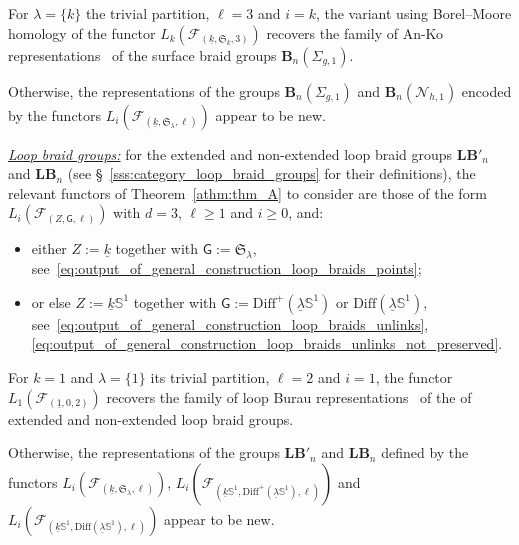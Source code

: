 \documentclass[AHL,Unicode,published]{cedram}
\newcommand{\Diff}{\mathrm{Diff}}
\newcommand{\B}{\ensuremath{\mathbf{B}}}
\newcommand{\lB}{\mathbf{LB}}
\newcommand{\Sym}{\mathfrak{S}}
\newcommand{\N}{\mathscr{N}}
\newcommand{\sG}{\mathsf{G}}
\newcommand{\cF}{\mathcal{F}}
\newcommand{\bS}{\mathbb{S}}
\renewcommand{\geq}{\geqslant}
\begin{document}
\begin{theo}\label{athm:thm_C_surface_braid_groups}
For $\lambda = \boldsymbol{\{} k \boldsymbol{\}}$ the trivial partition, $\ell = 3$ and $i=k$, the variant using Borel--Moore homology of the functor $L_{k}(\cF_{(\underline{k},\Sym_{k},3)})$ recovers the family of An-Ko representations~\cite{AnKo} of the surface braid groups $\B_{n}(\Sigma_{g,1})$.

Otherwise, the representations of the groups $\B_{n}(\Sigma_{g,1})$ and $\B_{n}(\N_{h,1})$ encoded by the functors $L_{i}(\cF_{(\underline{k},\Sym_{\lambda},\ell)})$ appear to be new.
\end{theo}

\noindent\underline{\emph{Loop braid groups:}} for the extended and non-extended loop braid groups $\lB'_{n}$ and $\lB_{n}$ (see \S~\ref{sss:category_loop_braid_groups} for their definitions), the relevant functors of Theorem~\ref{athm:thm_A} to consider are those of the form $L_{i}(\cF_{(Z,\sG,\ell)})$ with $d=3$, $\ell\geq 1$ and $i\geq 0$, and:
\begin{itemize}
\item either $Z:=\underline{k}$ together with $\sG:=\Sym_{\lambda}$, see~\eqref{eq:output_of_general_construction_loop_braids_points};
\item or else $Z:=\underline{k}\bS^{1}$ together with $\sG:=\Diff^{+}(\underline{\lambda}\bS^{1})$ or $\Diff(\underline{\lambda}\bS^{1})$, see~\eqref{eq:output_of_general_construction_loop_braids_unlinks}, \eqref{eq:output_of_general_construction_loop_braids_unlinks_not_preserved}.
\end{itemize}

\begin{theo}\label{athm:thm_C_loop_braid_groups}
For $k=1$ and $\lambda = \boldsymbol{\{} 1 \boldsymbol{\}}$ its trivial partition, $\ell = 2$ and $i=1$, the functor $L_{1}(\cF_{(\underline{1},0,2)})$ recovers the family of {loop Burau} representations~\cite{PS0} of the of extended and non-extended loop braid groups.

Otherwise, the representations of the groups $\lB'_{n}$ and $\lB_{n}$ defined by the functors $L_{i}(\cF_{(\underline{k},\Sym_{\lambda},\ell)})$, $L_{i}(\cF_{(\underline{k}\bS^{1},\Diff^{+}(\underline{\lambda}\bS^{1}),\ell)})$ and $L_{i}(\cF_{(\underline{k}\bS^{1},\Diff(\underline{\lambda}\bS^{1}),\ell)})$ appear to be new.
\end{theo}
\end{document}
